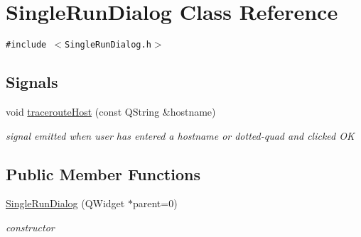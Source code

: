 \hypertarget{classSingleRunDialog}{
\section{SingleRunDialog Class Reference}
\label{classSingleRunDialog}
}
{\tt \#include $<$SingleRunDialog.h$>$}

\subsection*{Signals}
\begin{CompactItemize}
\item 
\hypertarget{classSingleRunDialog_633b6a44cc416ced896cbb9c313e4d94}{
void \hyperlink{classSingleRunDialog_633b6a44cc416ced896cbb9c313e4d94}{tracerouteHost} (const QString \&hostname)}
\label{classSingleRunDialog_633b6a44cc416ced896cbb9c313e4d94}

\begin{CompactList}\small\item\em signal emitted when user has entered a hostname or dotted-quad and clicked OK \item\end{CompactList}\end{CompactItemize}
\subsection*{Public Member Functions}
\begin{CompactItemize}
\item 
\hypertarget{classSingleRunDialog_056a14063162ba23807560703f97ed1e}{
\hyperlink{classSingleRunDialog_056a14063162ba23807560703f97ed1e}{SingleRunDialog} (QWidget $\ast$parent=0)}
\label{classSingleRunDialog_056a14063162ba23807560703f97ed1e}

\begin{CompactList}\small\item\em constructor \item\end{CompactList}\end{CompactItemize}
